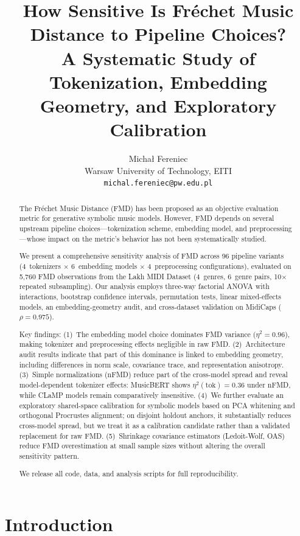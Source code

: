 \documentclass[a4paper]{article}
\title{How Sensitive Is Fréchet Music Distance to Pipeline Choices?\\
A Systematic Study of Tokenization, Embedding Geometry, and Exploratory Calibration}
\author{
  Michał Fereniec \\
  Warsaw University of Technology, EITI \\
  \texttt{michal.fereniec@pw.edu.pl}
}
\date{}
\begin{document}
\maketitle

\begin{abstract}
The Fréchet Music Distance (FMD) has been proposed as an objective evaluation metric for generative symbolic music models. However, FMD depends on several upstream pipeline choices---tokenization scheme, embedding model, and preprocessing---whose impact on the metric's behavior has not been systematically studied.

We present a comprehensive sensitivity analysis of FMD across 96 pipeline variants (4~tokenizers $\times$ 6~embedding models $\times$ 4~preprocessing configurations), evaluated on 5{,}760 FMD observations from the Lakh MIDI Dataset (4~genres, 6~genre pairs, 10$\times$ repeated subsampling). Our analysis employs three-way factorial ANOVA with interactions, bootstrap confidence intervals, permutation tests, linear mixed-effects models, an embedding-geometry audit, and cross-dataset validation on MidiCaps ($\rho = 0.975$).

Key findings:
(1)~The embedding model choice dominates FMD variance ($\eta^2 = 0.96$), making tokenizer and preprocessing effects negligible in raw FMD.
(2)~Architecture audit results indicate that part of this dominance is linked to embedding geometry, including differences in norm scale, covariance trace, and representation anisotropy.
(3)~Simple normalizations (nFMD) reduce part of the cross-model spread and reveal model-dependent tokenizer effects: MusicBERT shows $\eta^2(\text{tok}) = 0.36$ under nFMD, while CLaMP models remain comparatively insensitive.
(4)~We further evaluate an exploratory shared-space calibration for symbolic models based on PCA whitening and orthogonal Procrustes alignment; on disjoint holdout anchors, it substantially reduces cross-model spread, but we treat it as a calibration candidate rather than a validated replacement for raw FMD.
(5)~Shrinkage covariance estimators (Ledoit-Wolf, OAS) reduce FMD overestimation at small sample sizes without altering the overall sensitivity pattern.

We release all code, data, and analysis scripts for full reproducibility.
\end{abstract}

\section{Introduction}
\label{sec:intro}
\end{document}
